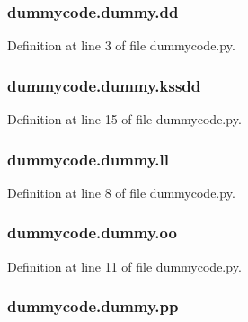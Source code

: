 \subsubsection[{dd}]{\setlength{\rightskip}{0pt plus 5cm}dummycode.\-dummy.\-dd}\label{classdummycode_1_1dummy_af2feb69e325549343d505d0f5afaacd0}


Definition at line 3 of file dummycode.\-py.

\subsubsection[{kssdd}]{\setlength{\rightskip}{0pt plus 5cm}dummycode.\-dummy.\-kssdd}\label{classdummycode_1_1dummy_ada8cd7476ddcf39248ec97cb1c7367e9}


Definition at line 15 of file dummycode.\-py.

\subsubsection[{ll}]{\setlength{\rightskip}{0pt plus 5cm}dummycode.\-dummy.\-ll}\label{classdummycode_1_1dummy_aff4159330a4c573597b401b5503818d7}


Definition at line 8 of file dummycode.\-py.

\subsubsection[{oo}]{\setlength{\rightskip}{0pt plus 5cm}dummycode.\-dummy.\-oo}\label{classdummycode_1_1dummy_a49635a45286e102fb960d0bc4f4c3621}


Definition at line 11 of file dummycode.\-py.

\subsubsection[{pp}]{\setlength{\rightskip}{0pt plus 5cm}dummycode.\-dummy.\-pp}\label{classdummycode_1_1dummy_a4ded8e4fa38d817b96c7b21a869a16ae}


